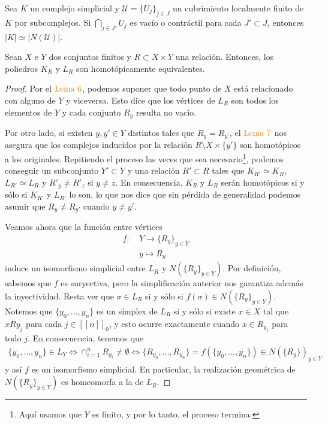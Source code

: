 \documentclass[11pt]{article}
\newcommand{\nat}[1]{[\![#1]\!]}
\newcommand{\natzero}[1]{\nat{#1}_0}
\newcommand{\paint}[1]{\color{color}{#1}}
\newenvironment{lemma}[2][Lema]{\begin{trivlist}
\item[\hskip \labelsep \paint{{\bfseries #1}}\hskip \labelsep {\bfseries #2.}]}{\end{trivlist}}
\newenvironment{exercise}[2][Ejercicio]{\begin{trivlist}
\item[\hskip \labelsep \paint{{\bfseries #1}}\hskip \labelsep {\bfseries #2.}]}{\end{trivlist}}
\begin{document}
\begin{lemma}{del Nervio} Sea $K$ un complejo simplicial y $\mathcal{U} = \{U_j\}_{j \in J}$ un cubrimiento localmente finito de $K$ por subcomplejos. Si $\bigcap_{j \in J'}U_j$ es vac\'io o contr\'actil para cada $J' \subset J$, entonces $|K| \simeq |N(\mathcal{U})|$. 
\end{lemma}

\begin{exercise}{(sobre poliedros y relaciones, en el caso finito)} Sean $X$ e $Y$ dos conjuntos finitos y $R \subset X \times Y$ una relaci\'on. Entonces, los poliedros $K_R$ y $L_R$ son homot\'opicamente equivalentes.
\end{exercise}
\begin{proof} Por el $\paint{\text{Lema $6$}}$, podemos suponer que todo punto de $X$ est\'a relacionado con alguno de $Y$ y viceversa. Esto dice que los v\'ertices de $L_R$ son todos los elementos de $Y$ y cada conjunto $R_y$ resulta no vac\'io.

Por otro lado, si existen $y,y' \in Y$ distintos tales que $R_y = R_{y'}$, el $\paint{\text{Lema $7$}}$ nos asegura que los complejos inducidos por la relaci\'on $R \setminus X \times \{y'\}$ son homot\'opicos a los originales. Repitiendo el proceso las veces que sea necesario\footnote{Aqu\'i usamos que $Y$ es finito, y por lo tanto, el proceso termina.}, podemos conseguir un subconjunto $Y' \subset Y$ y una relaci\'on $R' \subset R$ tales que $K_{R'} \simeq K_R$, $L_{R'} \simeq L_R$  y $R'_y \neq R'_z$ si $y \neq z$. En consecuencia, $K_R$ y $L_R$ ser\'an homot\'opicos si y s\'olo si $K_{R'}$ y $L_{R'}$ lo son, lo que nos dice que sin p\'erdida de generalidad podemos asumir que $R_{y} \neq R_{y'}$ cuando $y \neq y'$.

Veamos ahora que la funci\'on entre v\'ertices
\begin{align*}
f : \ &Y \to \{R_y\}_{y \in Y}\\
& y \mapsto R_y
\end{align*}
induce un isomorfismo simplicial entre $L_R$ y $N(\{R_y\}_{y\in Y})$. Por definici\'on, sabemos que $f$ es suryectiva, pero la simplificaci\'on anterior nos garantiza adem\'as la inyectividad. Resta ver que $\sigma \in L_R$ si y s\'olo si $f(\sigma) \in N(\{R_y\}_{y \in Y})$. Notemos que $\{y_0, \dots, y_n\}$ es un s\'implex de  $L_R$ si y s\'olo si existe $x \in X$ tal que $xRy_j$ para cada $j \in \natzero{n}$, y esto ocurre exactamente cuando $x \in R_{y_j}$ para todo $j$. En consecuencia, tenemos que
\begin{align*}
\{y_0,\dots,y_n\} \in L_Y \iff \cap_{i=1}^nR_{y_i} \neq \emptyset \iff \{R_{y_0}, \dots, R_{y_n}\} = f(\{y_0,\dots,y_n\}) \in N(\{R_y\})_{y \in Y}
\end{align*} 
y as\'i $f$ es un isomorfismo simplicial. En particular, la realizaci\'on geom\'etrica de $N(\{R_y\}_{y \in Y})$ es homeomorfa a la de $L_R$.


\end{proof}
\end{document}

